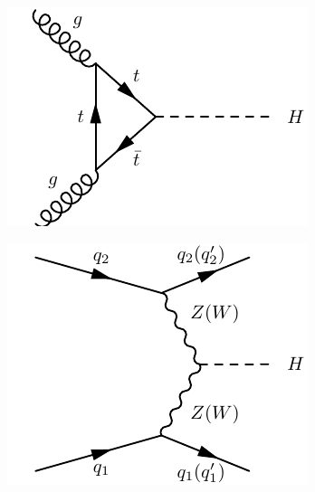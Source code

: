 \documentclass[10pt]{article}
\begin{document}
\begin{figure}[h!]

  \centering
      \begin{subfigure}[b]{0.245\textwidth}
\includegraphics[width=\textwidth]{"HiggsProduction/ggH"}
\caption{}
\end{subfigure}
    \begin{subfigure}[b]{0.245\textwidth}
\includegraphics[width=\textwidth]{"HiggsProduction/vbf"}
\caption{}
\label{vbf_prod}
\end{subfigure}
    \begin{subfigure}[b]{0.245\textwidth}

\end{subfigure}
\end{figure}
\end{document}
